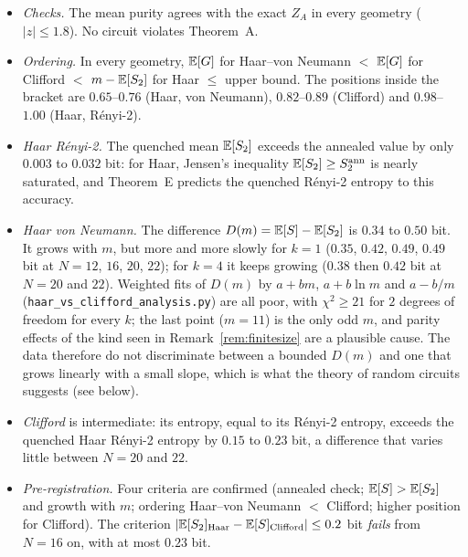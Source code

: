 \begin{itemize}[leftmargin=*,itemsep=1pt]
\item \emph{Checks.} The mean purity agrees with the exact $Z_A$ in every geometry ($|z|\le1.8$). No circuit violates Theorem~A.
\item \emph{Ordering.} In every geometry, $\mathbb{E}[G]$ for Haar--von Neumann $<$ $\mathbb{E}[G]$ for Clifford $<$ $m-\mathbb{E}[S_2]$ for Haar $\le$ upper bound. The positions inside the bracket are $0.65$--$0.76$ (Haar, von Neumann), $0.82$--$0.89$ (Clifford) and $0.98$--$1.00$ (Haar, R\'enyi-2).
\item \emph{Haar R\'enyi-2.} The quenched mean $\mathbb{E}[S_2]$ exceeds the annealed value by only $0.003$ to $0.032$ bit: for Haar, Jensen's inequality $\mathbb{E}[S_2]\ge S_2^{\mathrm{ann}}$ is nearly saturated, and Theorem~E predicts the quenched R\'enyi-2 entropy to this accuracy.
\item \emph{Haar von Neumann.} The difference $D(m)=\mathbb{E}[S]-\mathbb{E}[S_2]$ is $0.34$ to $0.50$ bit. It grows with $m$, but more and more slowly for $k=1$ ($0.35$, $0.42$, $0.49$, $0.49$ bit at $N=12$, $16$, $20$, $22$); for $k=4$ it keeps growing ($0.38$ then $0.42$ bit at $N=20$ and $22$). Weighted fits of $D(m)$ by $a+bm$, $a+b\ln m$ and $a-b/m$ (\texttt{haar\_vs\_clifford\_analysis.py}) are all poor, with $\chi^2\ge21$ for $2$ degrees of freedom for every $k$; the last point ($m=11$) is the only odd $m$, and parity effects of the kind seen in Remark~\ref{rem:finitesize} are a plausible cause. The data therefore do not discriminate between a bounded $D(m)$ and one that grows linearly with a small slope, which is what the theory of random circuits suggests (see below).
\item \emph{Clifford} is intermediate: its entropy, equal to its R\'enyi-2 entropy, exceeds the quenched Haar R\'enyi-2 entropy by $0.15$ to $0.23$ bit, a difference that varies little between $N=20$ and $22$.
\item \emph{Pre-registration.} Four criteria are confirmed (annealed check; $\mathbb{E}[S]>\mathbb{E}[S_2]$ and growth with $m$; ordering Haar--von Neumann $<$ Clifford; higher position for Clifford). The criterion $|\mathbb{E}[S_2]_{\rm Haar}-\mathbb{E}[S]_{\rm Clifford}|\le0.2$ bit \emph{fails} from $N=16$ on, with at most $0.23$ bit.
\end{itemize}
